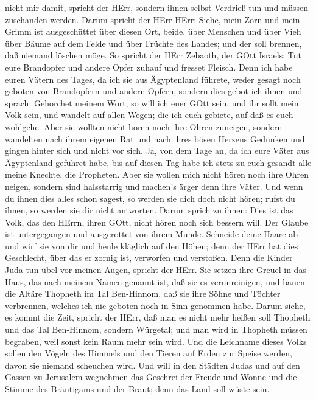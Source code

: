 nicht mir damit, spricht der HErr, sondern ihnen selbst Verdrieß tun und
müssen zuschanden werden.  Darum spricht der HErr HErr:
Siehe, mein Zorn und mein Grimm ist ausgeschüttet über diesen Ort,
beide, über Menschen und über Vieh über Bäume auf dem Felde und über
Früchte des Landes; und der soll brennen, daß niemand löschen möge.
 So spricht der HErr Zebaoth, der GOtt Israels: Tut eure
Brandopfer und andere Opfer zuhauf und fresset Fleisch. 
Denn ich habe euren Vätern des Tages, da ich sie aus Ägyptenland
führete, weder gesagt noch geboten von Brandopfern und andern Opfern,
 sondern dies gebot ich ihnen und sprach: Gehorchet meinem
Wort, so will ich euer GOtt sein, und ihr sollt mein Volk sein, und
wandelt auf allen Wegen; die ich euch gebiete, auf daß es euch wohlgehe.
 Aber sie wollten nicht hören noch ihre Ohren zuneigen,
sondern wandelten nach ihrem eigenen Rat und nach ihres bösen Herzens
Gedünken und gingen hinter sich und nicht vor sich.  Ja,
von dem Tage an, da ich eure Väter aus Ägyptenland geführet habe, bis
auf diesen Tag habe ich stets zu euch gesandt alle meine Knechte, die
Propheten.  Aber sie wollen mich nicht hören noch ihre
Ohren neigen, sondern sind halsstarrig und machen's ärger denn ihre
Väter.  Und wenn du ihnen dies alles schon sagest, so
werden sie dich doch nicht hören; rufst du ihnen, so werden sie dir
nicht antworten.  Darum sprich zu ihnen: Dies ist das Volk,
das den HErrn, ihren GOtt, nicht hören noch sich bessern will. Der
Glaube ist untergegangen und ausgerottet von ihrem Munde. 
Schneide deine Haare ab und wirf sie von dir und heule kläglich auf den
Höhen; denn der HErr hat dies Geschlecht, über das er zornig ist,
verworfen und verstoßen.  Denn die Kinder Juda tun übel vor
meinen Augen, spricht der HErr. Sie setzen ihre Greuel in das Haus, das
nach meinem Namen genannt ist, daß sie es verunreinigen, 
und bauen die Altäre Thopheth im Tal Ben-Hinnom, daß sie ihre Söhne und
Töchter verbrennen, welches ich nie geboten noch in Sinn genommen habe.
 Darum siehe, es kommt die Zeit, spricht der HErr, daß man
es nicht mehr heißen soll Thopheth und das Tal Ben-Hinnom, sondern
Würgetal; und man wird in Thopheth müssen begraben, weil sonst kein Raum
mehr sein wird.  Und die Leichname dieses Volks sollen den
Vögeln des Himmels und den Tieren auf Erden zur Speise werden, davon sie
niemand scheuchen wird.  Und will in den Städten Judas und
auf den Gassen zu Jerusalem wegnehmen das Geschrei der Freude und Wonne
und die Stimme des Bräutigams und der Braut; denn das Land soll wüste
sein.

